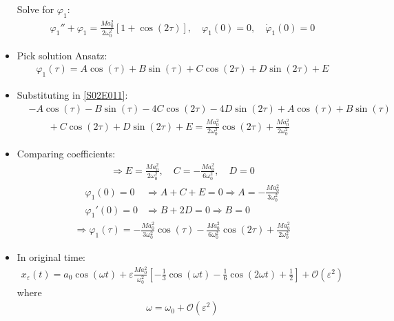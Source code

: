 \begin{solution}[2.3]
\begin{itemize}
	Solve for $\varphi_1$:
	\begin{align} \label{S02E011}
		\varphi_1'' + \varphi_1 = \frac{Ma_0^2}{2\omega_0^2}[1 + \cos(2\tau)], \quad \varphi_1(0)=0, \quad \dot{\varphi}_1(0)=0
	\end{align}
	\item Pick solution Ansatz:
	\begin{align}
		\varphi_1(\tau) = A\cos(\tau) + B\sin(\tau) + C\cos(2\tau) + D\sin(2\tau) + E
	\end{align}
	\item Substituting in \eqref{S02E011}:
	\begin{align}
		&-A\cos(\tau) - B\sin(\tau) - 4C\cos(2\tau) - 4D\sin(2\tau) + A\cos(\tau) + B\sin(\tau) \\
		&\qquad+ C\cos(2\tau) + D\sin(2\tau) + E 
		= \frac{Ma_0^2}{2\omega_0^2}\cos(2\tau) + \frac{Ma_0^2}{2\omega_0^2}
	\end{align}
	\item Comparing coefficients:
	\begin{align}
		\Longrightarrow E = \frac{Ma_0^2}{2\omega_0^2}, \quad C = -\frac{Ma_0^2}{6\omega_0^2},\quad D=0
	\end{align}
	\begin{align}
		\varphi_1(0)=0 &\Longrightarrow A+C+E=0 \Longrightarrow A = -\frac{Ma_0^2}{3\omega_0^2} \\
		\varphi_1'(0)=0 &\Longrightarrow B+2D=0 \Longrightarrow B=0
	\end{align}
	\begin{align}
		\Longrightarrow \boxed{\varphi_1(\tau) = -\frac{Ma_0^2}{3\omega_0^2}\cos(\tau) - \frac{Ma_0^2}{6\omega_0^2}\cos(2\tau) + \frac{Ma_0^2}{2\omega_0^2}}
	\end{align}
	\item In original time:
	\begin{align}
		x_\varepsilon(t) = a_0\cos(\omega t) + \varepsilon \frac{Ma_0^2}{\omega_0^2} \left[ -\frac{1}{3}\cos(\omega t) - \frac{1}{6}\cos(2\omega t) + \frac{1}{2} \right] + \mathcal{O}(\varepsilon^2)
	\end{align}
	where
	\begin{align}
		\omega = \omega_0 + \mathcal{O}(\varepsilon^2)
	\end{align}
\end{itemize}
\end{solution}


